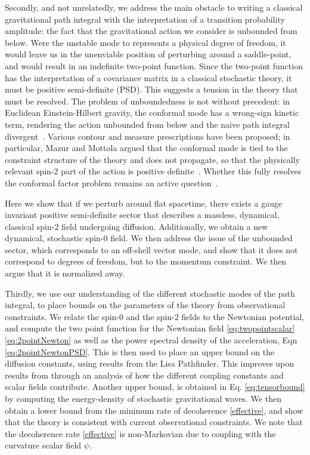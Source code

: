 \documentclass[aps,preprintnumbers,superscriptaddress,longbibliography]{revtex4-1}
\begin{document}
Secondly, and not unrelatedly, we address the main obstacle to writing a classical gravitational path integral with the interpretation of a transition probability amplitude: the fact that the gravitational action we consider is unbounded from below.  Were the unstable mode to represents a physical degree of freedom, it would leave us in the unenviable position of perturbing around a saddle-point, and would result in an indefinite two-point function. Since the two-point function has the interpretation of a covariance matrix in a classical stochastic theory, it must be positive semi-definite (PSD). This suggests a tension in the theory that must be resolved. The problem of unboundedness is not without precedent: in Euclidean Einstein-Hilbert gravity, the conformal mode has a wrong-sign kinetic term, rendering the action unbounded from below and the naive path integral divergent~\cite{gibbons1978path}. Various contour and measure prescriptions have been proposed; in particular, Mazur and Mottola argued that the conformal mode is tied to the constraint structure of the theory and does not propagate, so that the physically relevant spin-2 part of the action is positive definite~\cite{MAZUR}. Whether this fully resolves the conformal factor problem remains an active question~\cite{marolf2022gravitational}.

Here we show that if we perturb around flat spacetime, there exists a gauge invariant positive semi-definite sector that describes a massless, dynamical, classical spin-2 field undergoing diffusion. Additionally, we obtain a new dynamical, stochastic spin-0 field. We then address the issue of the unbounded sector, which corresponds to an off-shell vector mode, and show that it does not correspond to degrees of freedom, but to the momentum constraint. We then argue that it is normalized away. 

Thirdly, we use our understanding of the different stochastic modes of the path integral, to place bounds on the parameters of the theory from observational constraints. We relate the spin-0 and the spin-2 fields to the Newtonian potential, and compute the two point function for the Newtonian field \eqref{eq:twopointscalar} \eqref{eq:2pointNewton} as well as the power spectral density of the acceleration, Eqn \eqref{eq:2pointNewtonPSD}. This is then used to place an upper bound on the diffusion constants, %
 using results from the Lisa Pathfinder\cite{Armano_2024}. This improves upon results from \cite{grudka2024renormalisation} through an analysis of how the different coupling constants and scalar fields contribute. Another upper bound, is obtained  in Eq. \eqref{eq:tensorbound} by computing the energy-density of stochastic gravitational waves. We then obtain a lower bound from the minimum rate of decoherence \eqref{effective}, and show that the theory is consistent with current observational constraints. We note that the decoherence rate \eqref{effective} is non-Markovian due to coupling with the curvature scalar field $\psi$.
\end{document}
